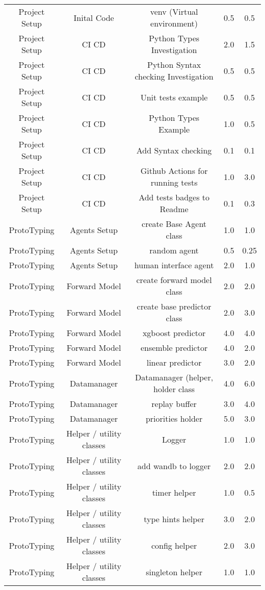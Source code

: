 \begin{longtable}{|c|c|c|c|c|}
	Project Setup & Inital Code & venv (Virtual environment) & 0.5 & 0.5 \\
	Project Setup & CI CD & Python Types Investigation & 2.0 & 1.5 \\
	Project Setup & CI CD & Python Syntax checking Investigation & 0.5 & 0.5 \\
	Project Setup & CI CD & Unit tests example & 0.5 & 0.5 \\
	Project Setup & CI CD & Python Types Example & 1.0 & 0.5 \\
	Project Setup & CI CD & Add Syntax checking  & 0.1 & 0.1 \\
	Project Setup & CI CD & Github Actions for running tests & 1.0 & 3.0 \\
	Project Setup & CI CD & Add tests badges to Readme & 0.1 & 0.3 \\
	ProtoTyping & Agents Setup & create Base Agent class & 1.0 & 1.0 \\
	ProtoTyping & Agents Setup & random agent & 0.5 & 0.25 \\
	ProtoTyping & Agents Setup & human interface agent & 2.0 & 1.0 \\
	ProtoTyping & Forward Model & create forward model class & 2.0 & 2.0 \\
	ProtoTyping & Forward Model & create base predictor class & 2.0 & 3.0 \\
	ProtoTyping & Forward Model & xgboost predictor & 4.0 & 4.0 \\
	ProtoTyping & Forward Model & ensemble predictor & 4.0 & 2.0 \\
	ProtoTyping & Forward Model & linear predictor & 3.0 & 2.0 \\
	ProtoTyping & Datamanager & Datamanager (helper, holder class  & 4.0 & 6.0 \\
	ProtoTyping & Datamanager & replay buffer & 3.0 & 4.0 \\
	ProtoTyping & Datamanager & priorities holder & 5.0 & 3.0 \\
	ProtoTyping & Helper / utility classes & Logger & 1.0 & 1.0 \\
	ProtoTyping & Helper / utility classes & add wandb to logger & 2.0 & 2.0 \\
	ProtoTyping & Helper / utility classes & timer helper  & 1.0 & 0.5 \\
	ProtoTyping & Helper / utility classes & type hints helper & 3.0 & 2.0 \\
	ProtoTyping & Helper / utility classes & config helper & 2.0 & 3.0 \\
	ProtoTyping & Helper / utility classes & singleton helper & 1.0 & 1.0 \\

\end{longtable}
